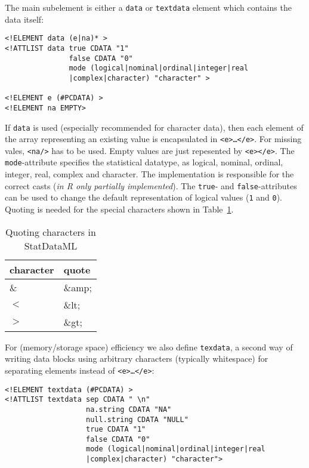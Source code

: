 \documentclass[a4paper]{article}
\begin{document}
The main subelement is either a \texttt{data} or
\texttt{textdata} element which contains the data itself:

\begin{verbatim}
<!ELEMENT data (e|na)* >
<!ATTLIST data true CDATA "1"
               false CDATA "0"
               mode (logical|nominal|ordinal|integer|real
               |complex|character) "character" >

<!ELEMENT e (#PCDATA) >
<!ELEMENT na EMPTY>
\end{verbatim}

If \texttt{data} is used (especially recommended for character data),
then each element of the array representing an existing value is
encapsulated in \texttt{<e>\ldots</e>}.  For missing vales,
\texttt{<na/>} has to be used.  Empty values are just repesented by
\texttt{<e></e>}. The \texttt{mode}-attribute specifies the
statistical datatype, as logical, nominal, ordinal, integer, real,
complex and character. The implementation is responsible for the
correct casts (\emph{in R only partially implemented}).  The
\texttt{true}- and \texttt{false}-attributes can be used to change the
default representation of logical values (\texttt{1} and \texttt{0}).
Quoting is needed for the special characters shown in
Table~\ref{quote}.

\begin{table}[h]
\begin{center}
\begin{tabular}{|l|l|} \hline
  character & quote \\ \hline \hline
  \& & \&amp; \\
  $<$ & \&lt; \\
  $>$ & \&gt; \\ \hline
\end{tabular}
\caption{\label{quote} Quoting characters in StatDataML}
\end{center}
\end{table}  


For (memory/storage space) efficiency we also define \texttt{texdata},
a second way of writing data blocks using arbitrary characters
(typically whitespace) for
separating elements instead of \texttt{<e>\ldots</e>}:

\begin{verbatim}
<!ELEMENT textdata (#PCDATA) >
<!ATTLIST textdata sep CDATA " \n" 
                   na.string CDATA "NA" 
                   null.string CDATA "NULL" 
                   true CDATA "1"
                   false CDATA "0"
                   mode (logical|nominal|ordinal|integer|real
                   |complex|character) "character">
\end{verbatim}
\end{document}
